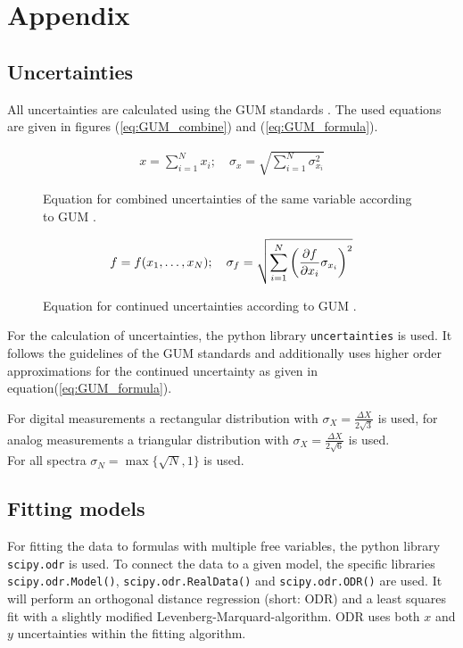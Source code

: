 \appendix
\section{Appendix}
\label{sec:anhang}

\subsection*{Uncertainties}

All uncertainties are calculated using the GUM standards \cite{gum}.
The used equations are given in figures (\ref{eq:GUM_combine}) and (\ref{eq:GUM_formula}).

\begin{figure}[H]
	\centering
	\begin{align}
		x = \sum_{i=1}^{N} x_i
		;\quad
		\sigma_x = \sqrt{\sum_{i = 1}^{N} \sigma_{x_i}^2}
		\label{eq:GUM_combine}
	\end{align}
	\caption*{Equation for combined uncertainties of the same variable according to GUM \cite{gum}.}
	\label{fig:GUM_combine}
\end{figure}

\begin{figure}[H]
	\centering
	\begin{align}
		f = f(x_1, \dots , x_N)
		;\quad
		\sigma_f = \sqrt{\sum_{i = 1}^{N}\left(\pdv{f}{x_i} \sigma_{x_i}\right) ^2}
		\label{eq:GUM_formula}
	\end{align}
	\caption*{Equation for continued uncertainties according to GUM \cite{gum}.}
	\label{fig:GUM_formula}
\end{figure}

\noindent For the calculation of uncertainties, the python library \texttt{uncertainties} is used.
It follows the guidelines of the GUM standards and additionally uses higher order approximations for the continued uncertainty as given in equation(\ref{eq:GUM_formula}).

For digital measurements a rectangular distribution with $\sigma_X = \frac{\Delta X}{2\sqrt{3}}$ is used, for analog measurements a triangular distribution with $\sigma_X = \frac{\Delta X}{2\sqrt{6}}$ is used.
\\For all spectra $\sigma_N = \max\{\sqrt{N}, 1\}$ is used.

\subsection*{Fitting models}

For fitting the data to formulas with multiple free variables, the python library \texttt{scipy.odr} is used.
To connect the data to a given model, the specific libraries \texttt{scipy.odr.Model()}, \texttt{scipy.odr.RealData()} and \texttt{scipy.odr.ODR()} are used.
It will perform an orthogonal distance regression (short: ODR) and a least squares fit with a slightly modified Levenberg-Marquard-algorithm.
ODR uses both $x$ and $y$ uncertainties within the fitting algorithm.
